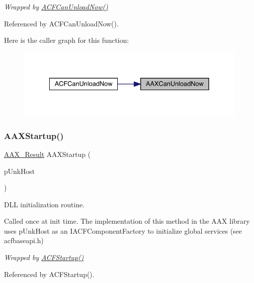{\itshape Wrapped by \mbox{\hyperlink{a00500_ae5327dbd8fd750c78eca3892831f4ad8}{A\+C\+F\+Can\+Unload\+Now()}} } 

Referenced by A\+C\+F\+Can\+Unload\+Now().

Here is the caller graph for this function\+:
\nopagebreak
\begin{figure}[H]
\begin{center}
\leavevmode
\includegraphics[width=328pt]{a00617_a160de7bc2883da8ba24400933d814523_icgraph}
\end{center}
\end{figure}
\mbox{\label{a00617_a0d9b6aed98567dfb34a38b69432b564d}} 
\subsubsection{\texorpdfstring{AAXStartup()}{AAXStartup()}}
{\footnotesize\ttfamily \mbox{\hyperlink{a00392_a4d8f69a697df7f70c3a8e9b8ee130d2f}{A\+A\+X\+\_\+\+Result}} A\+A\+X\+Startup (\begin{DoxyParamCaption}\item[{\mbox{\hyperlink{a01409}{I\+A\+C\+F\+Unknown}} $\ast$}]{p\+Unk\+Host }\end{DoxyParamCaption})}



D\+LL initialization routine. 

Called once at init time. The implementation of this method in the A\+AX library uses {\ttfamily p\+Unk\+Host} as an {\ttfamily I\+A\+C\+F\+Component\+Factory} to initialize global services (see acfbaseapi.\+h)

{\itshape Wrapped by \mbox{\hyperlink{a00500_ada314f5040499160998c3c444fbe4dfd}{A\+C\+F\+Startup()}} } 

Referenced by A\+C\+F\+Startup().

